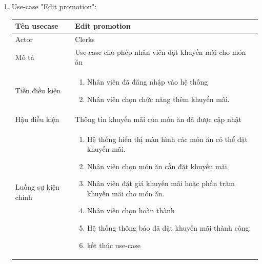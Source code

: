 \begin{enumerate}
    \newpage
    \item Use-case "Edit promotion":
    \begin{center}{\color{black}}
        \begin{tabular}{|p{5cm}|p{7cm}|} \hline
            Tên usecase &   Edit promotion\\ \hline
            Actor& Clerks \\ \hline
            Mô tả& Use-case cho phép nhân viên đặt khuyến mãi cho món ăn\\ \hline
            Tiền điều kiện &    
            \begin{enumerate}[1.]
                \item Nhân viên đã đăng nhập vào hệ thống
                \item Nhân viên chọn chức năng thêm khuyến mãi.
            \end{enumerate}\\ \hline
            Hậu điều kiện & Thông tin khuyến mãi của món ăn đã được cập nhật\\ \hline
            Luồng sự kiện chính &  
                \begin{enumerate}[1.]
                    \item Hệ thống hiển thị màn hình các món ăn có thể đặt khuyến mãi.
    				\item Nhân viên chọn món ăn cần đặt khuyến mãi.
    				\item Nhân viên đặt giá khuyến mãi hoặc phần trăm khuyến mãi cho món ăn.
    				\item Nhân viên chọn hoàn thành
    				\item Hệ thống thông báo đã đặt khuyến mãi thành công.
    				\item kết thúc use-case
                \end{enumerate}\\
            \hline
        \end{tabular}
    \end{center}
    

\end{enumerate}
